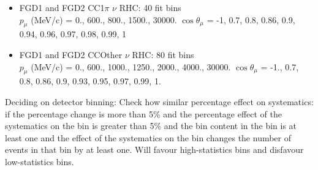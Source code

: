 \begin{itemize}
   \item FGD1 and FGD2 CC1$\pi$ $\nu$ RHC: 40 fit bins \\
     $p_\mu$ (MeV/c) = 0., 600., 800., 1500., 30000.
      $\cos\theta_\mu$ = -1, 0.7, 0.8, 0.86, 0.9, 0.94, 0.96, 0.97, 0.98, 0.99, 1

    \item FGD1 and FGD2 CCOther $\nu$ RHC: 80 fit bins \\
      $p_\mu$ (MeV/c) = 0., 600., 1000., 1250., 2000., 4000., 30000.
       $\cos\theta_\mu$ = -1., 0.7, 0.8, 0.86, 0.9, 0.93, 0.95, 0.97, 0.99, 1.
\end{itemize}

    Deciding on detector binning: 
    Check how similar percentage effect on systematics: if the percentage change is more than 5\% and the percentage effect of the systematics on the bin is greater than 5\% and the bin content in the bin is at least one and the effect of the systematics on the bin changes the number of events in that bin by at least one.
    Will favour high-statistics bins and disfavour low-statistics bins.

